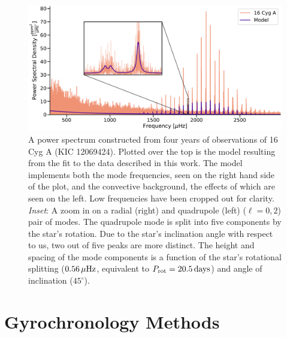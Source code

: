 \begin{figure}
	\centering
	\includegraphics[width=.99\textwidth]{Images/modelfit.pdf}
	\caption{A power spectrum constructed from four years of \kepler observations of 16 Cyg A (KIC 12069424). Plotted over the top is the model resulting from the fit to the data described in this work. The model implements both the mode frequencies, seen on the right hand side of the plot, and the convective background, the effects of which are seen on the left. Low frequencies have been cropped out for clarity. \textit{Inset}: A zoom in on a radial (right) and quadrupole (left) ($\ell = 0, 2$) pair of modes. The quadrupole mode is split into five components by the star's rotation. Due to the star's inclination angle with respect to us, two out of five peaks are more distinct. The height and spacing of the mode components is a function of the star's rotational splitting ($0.56\, \mu\rm{Hz}$, equivalent to $P_{\rm rot} = 20.5\, \rm{days}$) and angle of inclination ($45^\circ$).}
	\label{fig:modelfit}
\end{figure}


\section{Gyrochronology Methods}\label{s:gyro}
